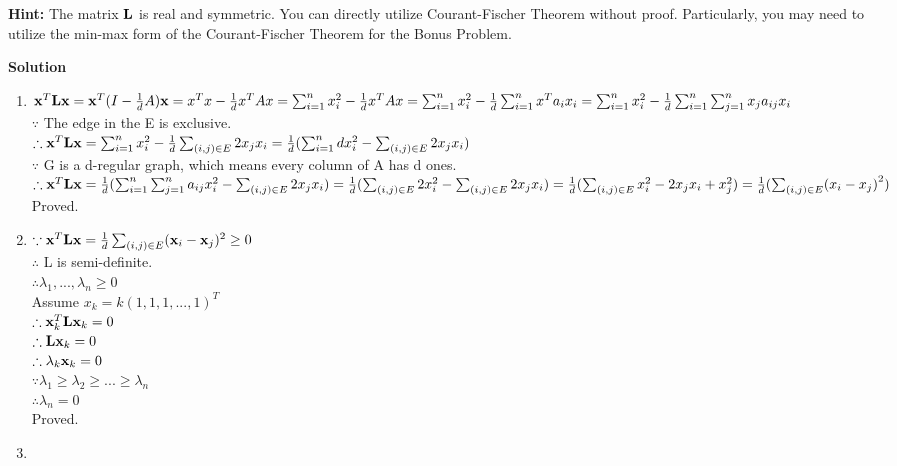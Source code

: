 \documentclass[english,onecolumn]{IEEEtran}
\newcommand{\bL}{{\bf L}}
\newcommand{\bx}{{\bf x}}
\begin{document}
\noindent\textbf{Hint:} 
The matrix $\bL$ is real and symmetric. 
	You can directly utilize Courant-Fischer Theorem without proof. Particularly, you may need to utilize the min-max form of the Courant-Fischer Theorem for the Bonus Problem.


\noindent
\textbf{Solution}
\begin{enumerate}
	\item
		$\bx^T\bL\bx=
		\bx^T(I-\frac{1}{d}A)\bx=
		x^Tx-\frac{1}{d}x^TAx=
		\sum_{i=1}^nx_i^2-\frac{1}{d}x^TAx=
		\sum_{i=1}^nx_i^2-\frac{1}{d}\sum_{i=1}^nx^Ta_ix_i=
		\sum_{i=1}^nx_i^2-\frac{1}{d}\sum_{i=1}^n\sum_{j=1}^nx_ja_{ij}x_i$\\
		$\because $ The edge in the E is exclusive.\\
		$\therefore \bx^T\bL\bx=
		\sum_{i=1}^nx_i^2-\frac{1}{d}\sum_{(i,j)\in E}2 x_j x_i=
		\frac{1}{d}(\sum_{i=1}^n d x_i^2-\sum_{(i,j)\in E}2 x_j x_i)$\\
		$\because $ G is a d-regular graph, which means every column of A has d ones.\\
		$\therefore \bx^T\bL\bx=
		\frac{1}{d}(\sum_{i=1}^n\sum_{j=1}^n a_{ij} x_i^2-\sum_{(i,j)\in E}2 x_j x_i)=
		\frac{1}{d}(\sum_{(i,j)\in E} 2 x_i^2-\sum_{(i,j)\in E}2 x_j x_i)=
		\frac{1}{d}(\sum_{(i,j)\in E}  x_i^2-2 x_j x_i +x_j^2)=
		\frac{1}{d}(\sum_{(i,j)\in E}  ({x_i-x_j)}^2)$\\
		Proved.
	\item
		$\because \bx^T\bL\bx=\frac{1}{d}\sum_{(i,j)\in E}(\bx_i-\bx_j)^2 \geq 0$\\
		$\therefore $ L is semi-definite.\\
		$\therefore \lambda_1,...,\lambda_n \geq 0$\\
		Assume $x_k=k(1,1,1,...,1)^T$\\
		$\therefore \bx_k^T\bL\bx_k=0$\\
		$\therefore \bL\bx_k=0$\\
		$\therefore \lambda_k\bx_k=0$\\
		$\because \lambda_1\geq \lambda_2\geq...\geq \lambda_n$\\
		$\therefore \lambda_n=0$\\
		Proved.
	\item
\end{enumerate}


\newpage
\end{document}
